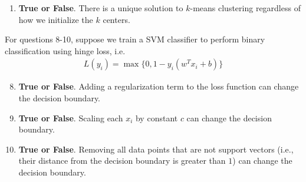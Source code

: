 \documentclass{article}
\newif\ifsolutions
\newenvironment{labelledanswer}{{\bf Answer:} \sf }{}%
\newcommand{\answer}[2]
{{
\ifsolutions
\begin{labelledanswer}
\color{red} 
#2
\end{labelledanswer}
\else
#1
\fi
}}
\begin{document}
\begin{enumerate}
\answer{}{False, we need random initialization. The reason is discussed in "Parameters Initialization" in Deep Learning Notes, but essentially to avoid the same output for first layer.}

\item \textbf{True or False}. There is a unique solution to $k$-means clustering regardless of how we initialize the $k$ centers. 

\answer{}{False, depending on how we initialize the $k$ centers, it'll impact the distance calculation to determine which group an examples belong to. This can in turn result in a different $k$-means solution as we run the algorithm each time through the same dataset.}

\end{enumerate}

\noindent For questions 8-10, suppose we train a SVM classifier to perform binary classification using hinge loss, i.e. 
\begin{align}
    L(y_i) = \max\{0, 1 - y_i (w^T x_i + b)\} 
\end{align}

\begin{enumerate}

\setcounter{enumi}{7}

\item \textbf{True or False}. Adding a regularization term to the loss function can change the decision boundary.

\answer{}{True, just like in class discussion on regularization and the non-separable case, this technique is used to make decision boundary less sensitive to outliers.}

\item \textbf{True or False}. Scaling each $x_i$ by constant $c$ can change the decision boundary.

\answer{}{False, since scaling all training data point by a constant c means that the distance from the points to decision boundary remains the same. SVM will again give us the same decision boundary.}

\item \textbf{True or False}. Removing all data points that are not support vectors (i.e., their distance from the decision boundary is greater than $1$) can change the decision boundary.

\answer{}{If done before introducing a new training, then True, because SVM would try to recreate the decision boundary using only the leftover points. However, if we mean that after we train, we only save the support vectors, and try to make prediction on a new point, then False, decision boundary remains the same.}

\end{enumerate}
\end{document}
